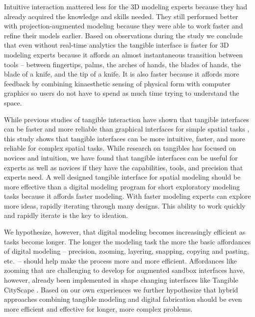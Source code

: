 \documentclass[prodmode,acmtochi]{acmsmall} %
\begin{document}
Intuitive interaction mattered less for the 3D modeling experts
because they had already acquired the knowledge and skills needed.
They still performed better with projection-augmented modeling
because they were able to work faster and refine their models earlier. 
%
Based on observations during the study we conclude that
even without real-time analytics
the tangible interface is faster for 3D modeling experts
because it affords an almost instantaneous transition
between tools -- between fingertips, palms, 
the arches of hands, the blades of hands, 
the blade of a knife, and the tip of a knife.
%
It is also faster because it affords more feedback 
by combining kinaesthetic sensing of physical form with computer graphics 
so users do not have to spend as much time trying to understand the space. 

While previous studies of tangible interaction 
have shown that tangible interfaces 
can be faster and more reliable than graphical interfaces 
for simple spatial tasks \cite{Huang2004,Couture2008},
this study shows that tangible interfaces can be 
more intuitive, faster, and more reliable for complex spatial tasks.
While research on tangibles has focused on novices and intuition,
we have found that tangible interfaces can be useful 
for experts as well as novices
if they have the capabilities, tools, and precision that experts need. 
A well designed tangible interface for spatial modeling 
should be more effective than a digital modeling program 
for short exploratory modeling tasks
because it affords faster modeling. 
With faster modeling experts can explore more ideas,
rapidly iterating through many designs. 
This ability to work quickly and rapidly iterate 
is the key to ideation. 

We hypothesize, however, that digital modeling 
becomes increasingly efficient as tasks become longer.
The longer the modeling task
the more the basic affordances of digital modeling
-- precision, zooming, layering, snapping, copying and pasting, etc.~--
should help make the process more and more efficient. 
%
Affordances like zooming 
that are challenging to develop for augmented sandbox interfaces
have, however, already been implemented in 
shape changing interfaces like Tangible CityScape \cite{Tang2013}.
%
Based on our own experiences
we further hypothesize that 
hybrid approaches combining 
tangible modeling and digital fabrication
should be even more efficient and effective
for longer, more complex problems.
\end{document}
